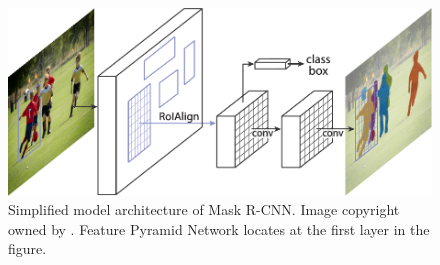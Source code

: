 \begin{figure}[!h]
	\centering
	\includegraphics[width=\figf\textwidth]{2-03.pdf}
    \caption[Simplified model architecture of Mask R-CNN]{Simplified model architecture of Mask R-CNN. Image copyright owned by \cite{maskrcnn}. Feature Pyramid Network locates at the first layer in the figure.}
    \label{fig:rcnnsimmod}
\end{figure}
